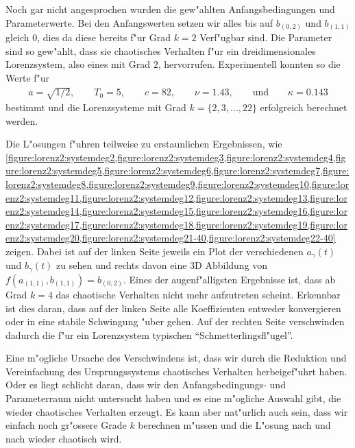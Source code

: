 Noch gar nicht angesprochen wurden die gew"ahlten Anfangsbedingungen und 
Parameterwerte. Bei den Anfangswerten setzen wir alles bis auf $b_{(0,2)}$ und 
$b_{(1,1)}$ gleich $0$, dies da diese bereits f"ur Grad $k = 2$ Verf"ugbar 
sind. Die Parameter sind so gew"ahlt, dass sie chaotisches Verhalten f"ur ein 
dreidimensionales Lorenzsystem, also eines mit Grad $2$, hervorrufen. 
Experimentell konnten so die Werte f"ur
\begin{align*}
	a = \sqrt{1/2},
	\qquad T_0 = 5,
	\qquad c = 82,
	\qquad \nu = 1.43,
	\qquad \text{und}
	\qquad \kappa = 0.143
\end{align*}
bestimmt und die Lorenzsysteme mit Grad $k = \{2,3,\dots,22\}$ erfolgreich 
berechnet werden.

Die L"osungen f"uhren teilweise zu erstaunlichen Ergebnissen, wie 
\cref{figure:lorenz2:systemdeg2,figure:lorenz2:systemdeg3,figure:lorenz2:systemdeg4,figure:lorenz2:systemdeg5,figure:lorenz2:systemdeg6,figure:lorenz2:systemdeg7,figure:lorenz2:systemdeg8,figure:lorenz2:systemdeg9,figure:lorenz2:systemdeg10,figure:lorenz2:systemdeg11,figure:lorenz2:systemdeg12,figure:lorenz2:systemdeg13,figure:lorenz2:systemdeg14,figure:lorenz2:systemdeg15,figure:lorenz2:systemdeg16,figure:lorenz2:systemdeg17,figure:lorenz2:systemdeg18,figure:lorenz2:systemdeg19,figure:lorenz2:systemdeg20,figure:lorenz2:systemdeg21-40,figure:lorenz2:systemdeg22-40}
zeigen. Dabei ist auf der linken Seite jeweils ein Plot der verschiedenen
$a_\gamma(t)$ und $b_\gamma(t)$ zu sehen und rechts davon eine 3D Abbildung von 
$f(a_{(1,1)}, b_{(1,1)}) = b_{(0,2)}$. Eines der augenf"alligsten 
Ergebnisse ist, dass ab Grad $k = 4$ das chaotische Verhalten nicht mehr 
aufzutreten scheint. Erkennbar ist dies daran, dass auf der linken Seite alle 
Koeffizienten entweder konvergieren oder in eine stabile Schwingung "uber 
gehen. Auf der rechten Seite verschwinden dadurch die f"ur ein Lorenzsystem 
typischen ``Schmetterlingsfl"ugel''.

Eine m"ogliche Ursache des Verschwindens ist, dass wir durch 
die Reduktion und Vereinfachung des Ursprungssystems chaotisches Verhalten 
herbeigef"uhrt haben. Oder es liegt schlicht daran, dass wir den 
Anfangsbedingungs- und Parameterraum nicht untersucht haben und es eine 
m"ogliche Auswahl gibt, die wieder chaotisches Verhalten erzeugt. Es kann 
aber nat"urlich auch sein, dass wir einfach noch gr"ossere Grade $k$ berechnen 
m"ussen und die L"osung nach und nach wieder chaotisch wird.

